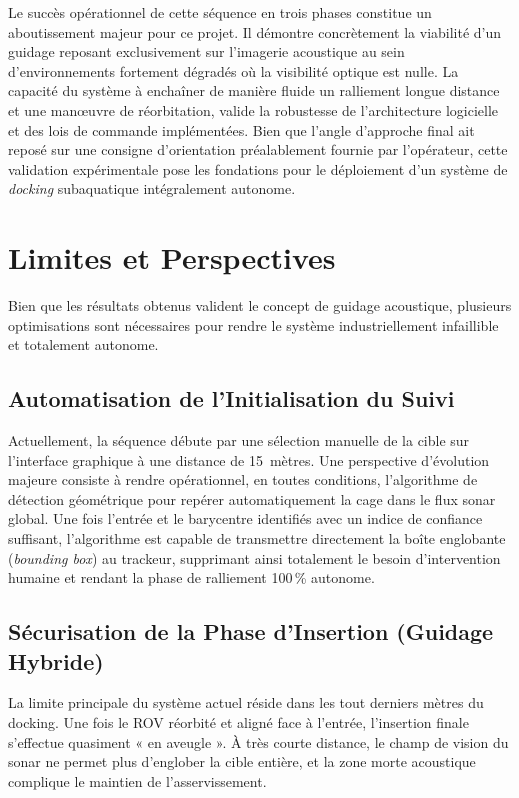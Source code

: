 Le succès opérationnel de cette séquence en trois phases constitue un aboutissement majeur pour ce projet. Il démontre concrètement la viabilité d'un guidage reposant exclusivement sur l'imagerie acoustique au sein d'environnements fortement dégradés où la visibilité optique est nulle. La capacité du système à enchaîner de manière fluide un ralliement longue distance et une manœuvre de réorbitation, valide la robustesse de l'architecture logicielle et des lois de commande implémentées. Bien que l'angle d'approche final ait reposé sur une consigne d'orientation préalablement fournie par l'opérateur, cette validation expérimentale pose les fondations pour le déploiement d'un système de \textit{docking} subaquatique intégralement autonome.

\section{Limites et Perspectives}

Bien que les résultats obtenus valident le concept de guidage acoustique, plusieurs optimisations sont nécessaires pour rendre le système industriellement infaillible et totalement autonome.

\subsection{Automatisation de l'Initialisation du Suivi} 
Actuellement, la séquence débute par une sélection manuelle de la cible sur l'interface graphique à une distance de 15~mètres. Une perspective d'évolution majeure consiste à rendre opérationnel, en toutes conditions, l'algorithme de détection géométrique pour repérer automatiquement la cage dans le flux sonar global. Une fois l'entrée et le barycentre identifiés avec un indice de confiance suffisant, l'algorithme est capable de transmettre directement la boîte englobante (\textit{bounding box}) au trackeur, supprimant ainsi totalement le besoin d'intervention humaine et rendant la phase de ralliement 100\,\% autonome.

\subsection{Sécurisation de la Phase d'Insertion (Guidage Hybride)} 
La limite principale du système actuel réside dans les tout derniers mètres du docking. Une fois le ROV réorbité et aligné face à l'entrée, l'insertion finale s'effectue quasiment « en aveugle ». À très courte distance, le champ de vision du sonar ne permet plus d'englober la cible entière, et la zone morte acoustique complique le maintien de l'asservissement. 

